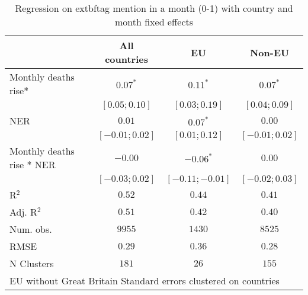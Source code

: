 
\begin{table}
\caption{Regression on 	extbf{tag mention in a month (0-1)} with country and month fixed effects}
\begin{center}
\begin{tabular}{l c c c}
\hline
 & All countries & EU & Non-EU \\
\hline
Monthly deaths rise*      & $0.07^{*}$       & $0.11^{*}$        & $0.07^{*}$       \\
                          & $ [ 0.05; 0.10]$ & $ [ 0.03;  0.19]$ & $ [ 0.04; 0.09]$ \\
NER                       & $0.01$           & $0.07^{*}$        & $0.00$           \\
                          & $ [-0.01; 0.02]$ & $ [ 0.01;  0.12]$ & $ [-0.01; 0.02]$ \\
Monthly deaths rise * NER & $-0.00$          & $-0.06^{*}$       & $0.00$           \\
                          & $ [-0.03; 0.02]$ & $ [-0.11; -0.01]$ & $ [-0.02; 0.03]$ \\
\hline
R$^2$                     & $0.52$           & $0.44$            & $0.41$           \\
Adj. R$^2$                & $0.51$           & $0.42$            & $0.40$           \\
Num. obs.                 & $9955$           & $1430$            & $8525$           \\
RMSE                      & $0.29$           & $0.36$            & $0.28$           \\
N Clusters                & $181$            & $26$              & $155$            \\
\hline
\multicolumn{4}{l}{\scriptsize{EU without Great Britain Standard errors clustered on countries}}
\end{tabular}
\label{table:coefficients}
\end{center}
\end{table}
